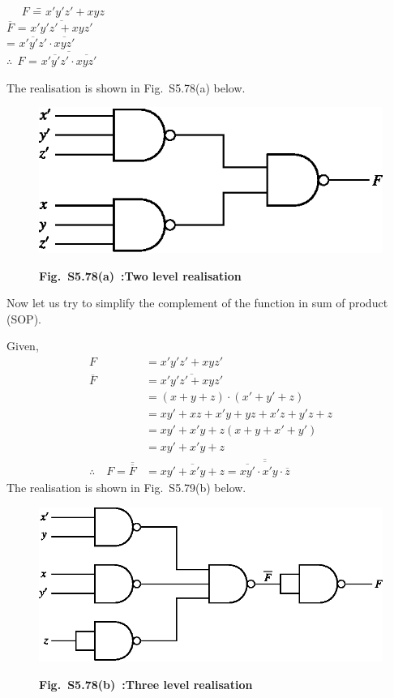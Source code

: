 \begin{solution}
\begin{tabbing}
\qquad\qquad~~ $F$ \== $x'y'z'+xyz$\\[4pt]
\phantom{AAAAAAi}$\overline{F}$ \>= $\overline{x'y'z'+xyz'}$\\[4pt]
               \>= $\overline{x'y'z'}\cdot \overline{xyz'}$\\[4pt]
\phantom{AAAAI}$\therefore~~F$ \>= $\overline{\overline{x'y'z'}\cdot \overline{xyz'}}$
\end{tabbing}

The realisation is shown in Fig.~S5.78(a) below.
\begin{figure}[H]
\centering
\includegraphics{chap5/figS5.eps}

\smallskip
{\bf Fig.~S5.78(a)~:Two level realisation}
\end{figure}

Now let us try to simplify the complement of the function in sum of product (SOP).

Given,
\begin{align*}
F &= x'y'z'+xyz'\\[3pt]
\overline{F} &= \overline{x'y'z'+xyz'}\\[3pt]
&= (x+y+z)\cdot (x'+y'+z)\\[3pt]
&= xy'+xz+x'y+yz+x'z+y'z+z\\[3pt]
&= xy'+x'y+z(x+y+x'+y')\\[3pt]
&= xy'+x'y+z\\[3pt]
\therefore\quad F=\overline{\overline{F}} &= \overline{xy'+x'y+z} = \overline{\overline{\overline{xy'}\cdot x'y\cdot \overline{z}}}
\end{align*}
The realisation is shown in Fig.~S5.79(b) below.
\begin{figure}[H]
\centering
\includegraphics{chap5/figS6.eps}

\smallskip
{\bf Fig.~S5.78(b)~:Three level realisation}
\end{figure}
\end{solution}

